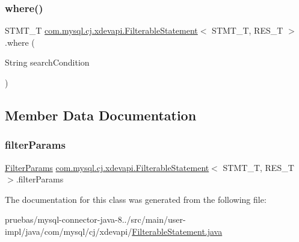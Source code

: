 \mbox{\label{classcom_1_1mysql_1_1cj_1_1xdevapi_1_1_filterable_statement_a358165df9da77ebe27c3b18414a13747}} 
\subsubsection{\texorpdfstring{where()}{where()}}
{\footnotesize\ttfamily S\+T\+M\+T\+\_\+T \mbox{\hyperlink{classcom_1_1mysql_1_1cj_1_1xdevapi_1_1_filterable_statement}{com.\+mysql.\+cj.\+xdevapi.\+Filterable\+Statement}}$<$ S\+T\+M\+T\+\_\+T, R\+E\+S\+\_\+T $>$.where (\begin{DoxyParamCaption}\item[{String}]{search\+Condition }\end{DoxyParamCaption})}



\subsection{Member Data Documentation}
\mbox{\label{classcom_1_1mysql_1_1cj_1_1xdevapi_1_1_filterable_statement_a0004223ee831ad799fd8c17dec2dc7f9}} 
\subsubsection{\texorpdfstring{filter\+Params}{filterParams}}
{\footnotesize\ttfamily \mbox{\hyperlink{classcom_1_1mysql_1_1cj_1_1xdevapi_1_1_filter_params}{Filter\+Params}} \mbox{\hyperlink{classcom_1_1mysql_1_1cj_1_1xdevapi_1_1_filterable_statement}{com.\+mysql.\+cj.\+xdevapi.\+Filterable\+Statement}}$<$ S\+T\+M\+T\+\_\+T, R\+E\+S\+\_\+T $>$.filter\+Params\hspace{0.3cm}{\ttfamily [protected]}}



The documentation for this class was generated from the following file\+:\begin{DoxyCompactItemize}
\item 
pruebas/mysql-\/connector-\/java-\/8../src/main/user-\/impl/java/com/mysql/cj/xdevapi/\mbox{\hyperlink{_filterable_statement_8java}{Filterable\+Statement.\+java}}\end{DoxyCompactItemize}
